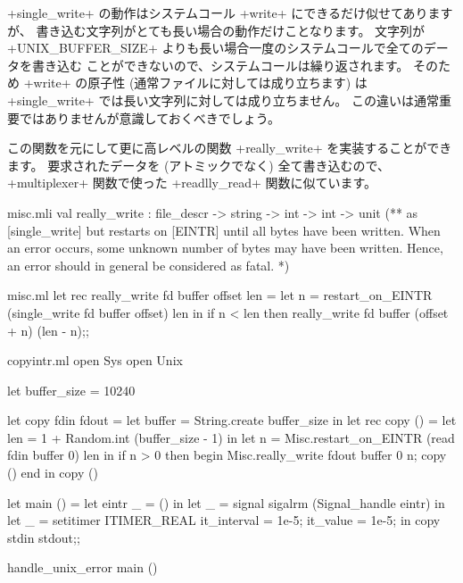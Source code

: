 \ml+single_write+ の動作はシステムコール \ml+write+ にできるだけ似せてありますが、
書き込む文字列がとても長い場合の動作だけことなります。
文字列が \ml+UNIX_BUFFER_SIZE+ よりも長い場合一度のシステムコールで全てのデータを書き込む
ことができないので、システムコールは繰り返されます。
そのため \ml+write+ の原子性 (通常ファイルに対しては成り立ちます) は
\ml+single_write+ では長い文字列に対しては成り立ちません。
この違いは通常重要ではありませんが意識しておくべきでしょう。

この関数を元にして更に高レベルの関数 \ml+really_write+ を実装することができます。
要求されたデータを (アトミックでなく) 全て書き込むので、
\ml+multiplexer+ 関数で使った \ml+readlly_read+ 関数に似ています。
%
\begin{codefile}{misc.mli}
val really_write : file_descr -> string -> int -> int -> unit
(** as [single_write] but restarts on [EINTR] until all bytes have been
written. When an error occurs, some unknown number of bytes may have been
written. Hence, an error should in general be considered as fatal. *)
\end{codefile}
%
\begin{listingcodefile}{misc.ml}
let rec really_write fd buffer offset len =
  let n = restart_on_EINTR (single_write fd buffer offset) len in
  if n < len then really_write fd buffer (offset + n) (len - n);;
\end{listingcodefile}
%
\begin{codefile}{copyintr.ml}
open Sys
open Unix

let buffer_size = 10240

let copy fdin fdout =
  let buffer = String.create buffer_size in
  let rec copy ()  =
    let len = 1 + Random.int (buffer_size - 1) in
    let n = Misc.restart_on_EINTR (read fdin buffer 0) len in
    if n > 0 then
      begin
        Misc.really_write fdout buffer 0 n;
        copy ()
      end in
  copy ()

let main () =
  let eintr _ = () in
  let _ = signal sigalrm (Signal_handle eintr) in
  let _ = setitimer ITIMER_REAL { it_interval = 1e-5; it_value = 1e-5; } in
  copy stdin stdout;;

handle_unix_error main ()
\end{codefile}
%

